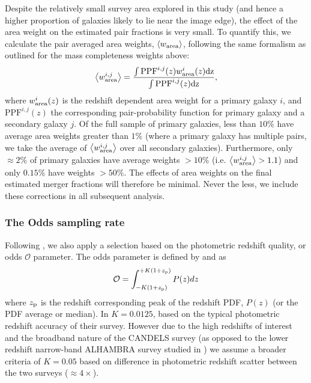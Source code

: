 Despite the relatively small survey area explored in this study (and hence a higher proportion of galaxies likely to lie near the image edge), the effect of the area weight on the estimated pair fractions is very small. To quantify this, we calculate the pair averaged area weights, $\left \langle w_{\rm{area}} \right \rangle$, following the same formalism as outlined for the mass completeness weights above:
\begin{equation}
	\left \langle w_{\rm{area}}^{i,j} \right \rangle = \frac{\int \text{PPF}^{i,j}(z) w_{\rm{area}}^{i}(z) \rm{d}z}{\int \text{PPF}^{i,j}(z) \rm{d}z},
\end{equation}
where $w_{\rm{area}}^{i}(z)$ is the redshift dependent area weight for a primary galaxy $i$, and $\text{PPF}^{i,j}(z)$ the corresponding pair-probability function for primary galaxy and a secondary galaxy $j$. Of the full sample of primary galaxies, less than $10\%$ have average area weights greater than $1\%$ (where a primary galaxy has multiple pairs, we take the average of $\left \langle w_{\rm{area}}^{i,j} \right \rangle$ over all secondary galaxies). Furthermore, only $\approx 2\%$ of primary galaxies have average weights $>10\%$ (i.e. $\left \langle w_{\rm{area}}^{i,j} \right \rangle > 1.1$) and only $0.15\%$ have weights $>50\%$. The effects of area weights on the final estimated merger fractions will therefore be minimal. Never the less, we include these corrections in all subsequent analysis.

\subsubsection{The Odds sampling rate}\label{merger-sec:weights_osr}
Following , we also apply a selection based on the photometric redshift quality, or odds $\mathcal{O}$ parameter. The odds parameter is defined by \citet{Benitez:2000jr} and \citet{Molino:2014iz} as
\begin{equation}
	\mathcal{O} = \int_{-K(1+z_{\rm{p}})}^{+K(1+z_{\rm{p}})} P(z) dz
\end{equation}
where $z_{\rm{p}}$ is the redshift corresponding peak of the redshift PDF, $P(z)$ (or the PDF average or median). In \citet{Molino:2014iz} $K = 0.0125$, based on the typical photometric redshift accuracy of their survey. However due to the high redshifts of interest and the broadband nature of the CANDELS survey (as opposed to the lower redshift narrow-band ALHAMBRA survey studied in \citet{Molino:2014iz}) we assume a broader criteria of $K = 0.05$ based on difference in photometric redshift scatter between the two surveys ($\approx 4\times$).

